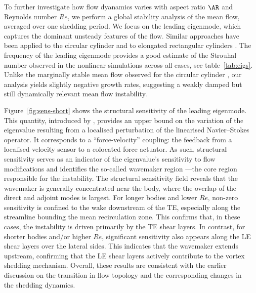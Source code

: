 %
To further investigate how flow dyanamics varies with aspect ratio $\AR$ and Reynolds number $Re$, we perform a global stability analysis of the mean flow, averaged over one shedding period. We focus on the leading eigenmode, which captures the dominant unsteady features of the flow. Similar approaches have been applied to the circular cylinder \citep{pier-2002, barkley-2006} and to elongated rectangular cylinders \citep{chiarini-quadrio-auteri-2022}.
%
The frequency of the leading eigenmode provides a good estimate of the Strouhal number observed in the nonlinear simulations across all cases, see table~\ref{tab:eigs}. Unlike the marginally stable mean flow observed for the circular cylinder \citep{barkley-2006}, our analysis yields slightly negative growth rates, suggesting a weakly damped but still dynamically relevant mean flow instability.

Figure~\ref{fig:sens-short} shows the structural sensitivity of the leading eigenmode. This quantity, introduced by \cite{giannetti-luchini-2007}, provides an upper bound on the variation of the eigenvalue resulting from a localised perturbation of the linearised Navier--Stokes operator. It corresponds to a ``force-velocity'' coupling: the feedback from a localised velocity sensor to a colocated force actuator. As such, structural sensitivity serves as an indicator of the eigenvalue's sensitivity to flow modifications and identifies the so-called wavemaker region \citep{monkewitz-etal-1993}---the core region responsible for the instability.
%
The structural sensitivity field reveals that the wavemaker is generally concentrated near the body, where the overlap of the direct and adjoint modes is largest. For longer bodies and lower $Re$, non-zero sensitivity is confined to the wake downstream of the TE, especially along the streamline bounding the mean recirculation zone. This confirms that, in these cases, the instability is driven primarily by the TE shear layers.
%
In contrast, for shorter bodies and/or higher $Re$, significant sensitivity also appears along the LE shear layers over the lateral sides. This indicates that the wavemaker extends upstream, confirming that the LE shear layers actively contribute to the vortex shedding mechanism. Overall, these results are consistent with the earlier discussion on the transition in flow topology and the corresponding changes in the shedding dynamics.


\iffalse


